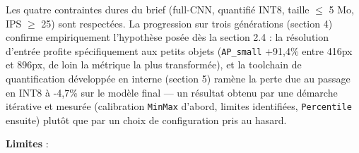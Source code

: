 \documentclass[11pt,a4paper]{article}
\begin{document}
    Les quatre contraintes dures du brief (full-CNN, quantifié INT8, taille
    $\leq$ 5 Mo, IPS $\geq$ 25) sont respectées. La progression sur trois générations
    (section 4) confirme empiriquement l'hypothèse posée dès la section 2.4
    : la résolution d'entrée profite spécifiquement aux petits objets
    (\texttt{AP\_small} +91,4\% entre 416px et 896px, de loin la métrique la
    plus transformée), et la toolchain de quantification développée en
    interne (section 5) ramène la perte due au passage en INT8 à -4,7\% sur
    le modèle final --- un résultat obtenu par une démarche itérative et
    mesurée (calibration \texttt{MinMax} d'abord, limites identifiées,
    \texttt{Percentile} ensuite) plutôt que par un choix de configuration
    pris au hasard.
    
    \textbf{Limites} :
    
\end{document}

